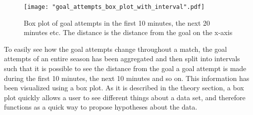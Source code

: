 \documentclass[Report.tex]{subfiles}
\begin{document}
\begin{figure}
\center
\texttt{[image: "goal\_attempts\_box\_plot\_with\_interval".pdf]}
\caption{Box plot of goal attempts in the first 10 minutes, the next 20 minutes etc. The distance is the distance from the goal on the x-axis}
\label{Fig:goal_attempts_box_plot}
\end{figure}

To easily see how the goal attempts change throughout a match, the goal attempts of an entire season has been aggregated and then
split into intervals such that it is possible to see the distance from the goal a goal attempt is made during the first 10 minutes, the next
10 minutes and so on. This information has been visualized using a box plot. As it is described in the theory section, a box plot quickly
allows a user to see different things about a data set, and therefore functions as a quick way to propose hypotheses about the data.
\end{document}
